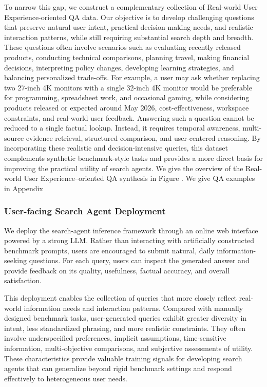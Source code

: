 \documentclass{huawei}
\begin{document}
To narrow this gap, we construct a complementary collection of Real-world User Experience-oriented QA data. Our objective is to develop challenging questions that preserve natural user intent, practical decision-making needs, and realistic interaction patterns, while still requiring substantial search depth and breadth. These questions often involve scenarios such as evaluating recently released products, conducting technical comparisons, planning travel, making financial decisions, interpreting policy changes, developing learning strategies, and balancing personalized trade-offs.
For example, a user may ask whether replacing two 27-inch 4K monitors with a single 32-inch 4K monitor would be preferable for programming, spreadsheet work, and occasional gaming, while considering products released or expected around May 2026, cost-effectiveness, workspace constraints, and real-world user feedback. Answering such a question cannot be reduced to a single factual lookup. Instead, it requires temporal awareness, multi-source evidence retrieval, structured comparison, and user-centered reasoning. By incorporating these realistic and decision-intensive queries, this dataset complements synthetic benchmark-style tasks and provides a more direct basis for improving the practical utility of search agents.
We give the overview of the Real-world User Experience–oriented QA synthesis in Figure .
We give QA examples in Appendix 





\subsubsection{User-facing Search Agent Deployment}
We deploy the search-agent inference framework through an online web interface powered by a strong LLM. Rather than interacting with artificially constructed benchmark prompts, users are encouraged to submit natural, daily information-seeking questions. For each query, users can inspect the generated answer and provide feedback on its quality, usefulness, factual accuracy, and overall satisfaction.



This deployment enables the collection of queries that more closely reflect real-world information needs and interaction patterns. Compared with manually designed benchmark tasks, user-generated queries exhibit greater diversity in intent, less standardized phrasing, and more realistic constraints. They often involve underspecified preferences, implicit assumptions, time-sensitive information, multi-objective comparisons, and subjective assessments of utility. These characteristics provide valuable training signals for developing search agents that can generalize beyond rigid benchmark settings and respond effectively to heterogeneous user needs.
\end{document}
